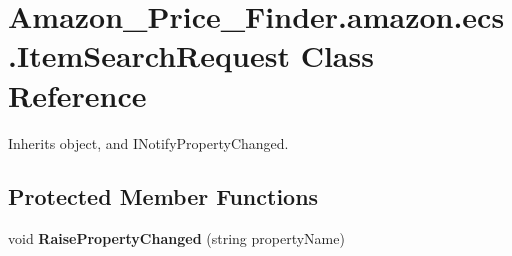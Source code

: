 \hypertarget{class_amazon___price___finder_1_1amazon_1_1ecs_1_1_item_search_request}{\section{Amazon\-\_\-\-Price\-\_\-\-Finder.\-amazon.\-ecs.\-Item\-Search\-Request Class Reference}
\label{class_amazon___price___finder_1_1amazon_1_1ecs_1_1_item_search_request}
}


 




Inherits object, and I\-Notify\-Property\-Changed.

\subsection*{Protected Member Functions}
\begin{DoxyCompactItemize}
\item 
\hypertarget{class_amazon___price___finder_1_1amazon_1_1ecs_1_1_item_search_request_a179da3ba6d73574576e57035bed44ca6}{void {\bfseries Raise\-Property\-Changed} (string property\-Name)}\label{class_amazon___price___finder_1_1amazon_1_1ecs_1_1_item_search_request_a179da3ba6d73574576e57035bed44ca6}

\end{DoxyCompactItemize}
